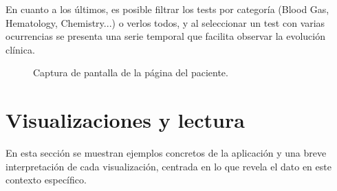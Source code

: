 En cuanto a los últimos, es posible filtrar los tests por categoría (Blood Gas, Hematology, Chemistry...) o verlos todos, y al seleccionar un test con varias ocurrencias se presenta una serie temporal que facilita observar la evolución clínica.
\begin{figure}[H]
  \centering
  \caption{Captura de pantalla de la página del paciente.}
  \label{fig:patient}
\end{figure}

\section{Visualizaciones y lectura}
En esta sección se muestran ejemplos concretos de la aplicación y una breve interpretación de cada visualización, centrada en lo que revela el dato en este contexto específico.

